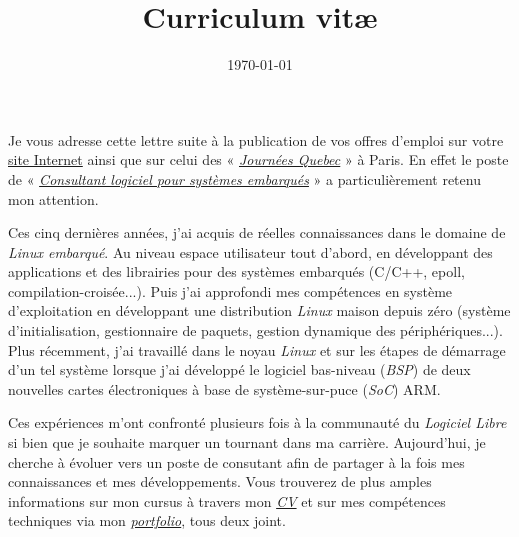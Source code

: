 \documentclass[11pt,a4paper,sans]{moderncv}
\title{Curriculum vit\ae}
\date{\today}
\begin{document}
\makelettertitle

Je vous adresse cette lettre suite à la publication de vos offres d'emploi sur votre \href{https://carrieres.savoirfairelinux.com/}{site Internet} ainsi que sur celui des « \href{http://journeesquebec.gouv.qc.ca/}{\textit{Journées Quebec}} » à Paris. En effet le poste de « \href{https://carrieres.savoirfairelinux.com/#consultant-logiciel-pour-systemes-embarques}{\textit{Consultant logiciel pour systèmes embarqués}} » a particulièrement retenu mon attention.

Ces cinq dernières années, j'ai acquis de réelles connaissances dans le domaine de \textit{Linux embarqué}. Au niveau espace utilisateur tout d'abord, en développant des applications et des librairies pour des systèmes embarqués (C/C++, epoll, compilation-croisée...). Puis j'ai approfondi mes compétences en système d'exploitation en développant une distribution \textit{Linux} maison depuis zéro (système d'initialisation, gestionnaire de paquets, gestion dynamique des périphériques...). Plus récemment, j'ai travaillé dans le noyau \textit{Linux} et sur les étapes de démarrage d'un tel système lorsque j'ai développé le logiciel bas-niveau (\textit{BSP}) de deux nouvelles cartes électroniques à base de système-sur-puce (\textit{SoC}) ARM.

Ces expériences m'ont confronté plusieurs fois à la communauté du \textit{Logiciel Libre} si bien que je souhaite marquer un tournant dans ma carrière. Aujourd'hui, je cherche à évoluer vers un poste de consutant afin de partager à la fois mes connaissances et mes développements. Vous trouverez de plus amples informations sur mon cursus à travers mon \href{http://portay.fr/journees-quebec/pdf/french.pdf}{\textit{CV}} et sur mes compétences techniques via mon \href{http://portay.fr/journees-quebec/pdf/portfolio-french.pdf}{\textit{portfolio}}, tous deux joint.

\makeletterclosing
\end{document}
